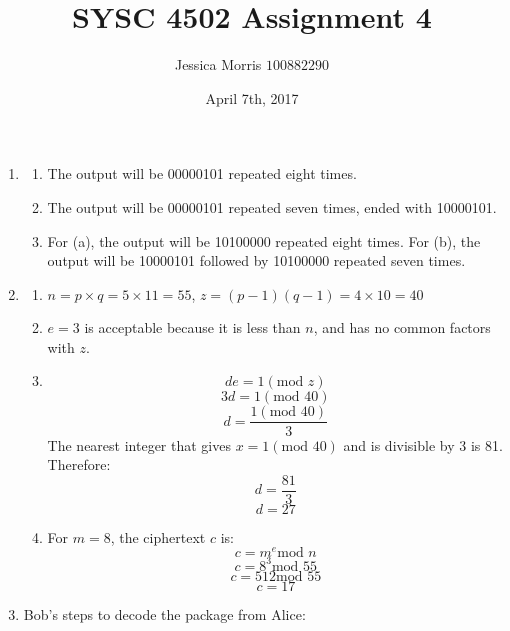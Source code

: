 \documentclass{article}
\title{SYSC 4502 Assignment 4}
\date{April 7th, 2017}
\author{Jessica Morris \(100882290\)}
\begin{document}
\maketitle

\begin{enumerate}

\item
\begin{enumerate}

\item The output will be 00000101 repeated eight times.

\item The output will be 00000101 repeated seven times, ended with 10000101.

\item For (a), the output will be 10100000 repeated eight times. For (b), the output will be 10000101 followed by 
10100000 repeated seven times.

\end{enumerate}

\item
\begin{enumerate}

\item $ n = p \times q = 5 \times 11 = 55 $, $ z = (p-1)(q-1) = 4 \times 10 = 40 $

\item $ e = 3 $ is acceptable because it is less than $n$, and has no common factors with $z$.

\item $$ de = 1(\text{mod } z) $$
$$ 3d = 1(\text{mod } 40) $$
$$ d = \frac{1(\text{mod } 40)}{3} $$
The nearest integer that gives $ x = 1(\text{mod } 40) $ and is divisible by 3 is 81. Therefore:
$$ d = \frac{81}{3} $$
$$ d = 27 $$

\item For $ m = 8 $, the ciphertext $c$ is:
$$ c = m^e \text{mod } n $$
$$ c = 8^3 \text{mod } 55 $$
$$ c = 512 \text{mod } 55 $$
$$ c = 17 $$

\end{enumerate}

\item Bob's steps to decode the package from Alice:

\end{enumerate}
\end{document}
